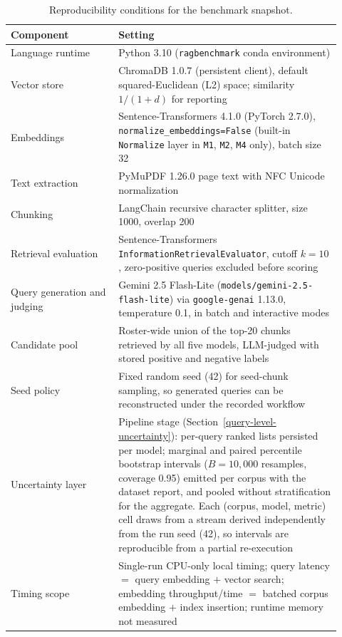 \begin{table}[htbp]
\caption{Reproducibility conditions for the benchmark snapshot.}\label{tbl:reproducibility}
\centering
\small
\begin{tabular}{@{}>{\raggedright\arraybackslash}p{0.30\linewidth}>{\raggedright\arraybackslash}p{0.62\linewidth}@{}}
\toprule
Component & Setting \\
\midrule
Language runtime & Python 3.10 (\texttt{ragbenchmark} conda environment) \\
Vector store & ChromaDB 1.0.7 (persistent client), default squared-Euclidean (L2) space; similarity $1/(1+d)$ for reporting \\
Embeddings & Sentence-Transformers 4.1.0 (PyTorch 2.7.0), \texttt{normalize\_embeddings=False} (built-in \texttt{Normalize} layer in \texttt{M1}, \texttt{M2}, \texttt{M4} only), batch size 32 \\
Text extraction & PyMuPDF 1.26.0 page text with NFC Unicode normalization \\
Chunking & LangChain recursive character splitter, size 1000, overlap 200 \\
Retrieval evaluation & Sentence-Transformers \texttt{InformationRetrievalEvaluator}, cutoff $k=10$, zero-positive queries excluded before scoring \\
Query generation and judging & Gemini 2.5 Flash-Lite (\texttt{models/gemini-2.5-flash-lite}) via \texttt{google-genai} 1.13.0, temperature 0.1, in batch and interactive modes \\
Candidate pool & Roster-wide union of the top-20 chunks retrieved by all five models, LLM-judged with stored positive and negative labels \\
Seed policy & Fixed random seed (42) for seed-chunk sampling, so generated queries can be reconstructed under the recorded workflow \\
Uncertainty layer & Pipeline stage (Section~\ref{query-level-uncertainty}): per-query ranked lists persisted per model; marginal and paired percentile bootstrap intervals ($B=10{,}000$ resamples, coverage 0.95) emitted per corpus with the dataset report, and pooled without stratification for the aggregate. Each (corpus, model, metric) cell draws from a stream derived independently from the run seed (42), so intervals are reproducible from a partial re-execution \\
Timing scope & Single-run CPU-only local timing; query latency $=$ query embedding $+$ vector search; embedding throughput/time $=$ batched corpus embedding $+$ index insertion; runtime memory not measured \\

\end{tabular}
\end{table}
